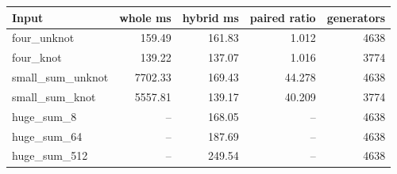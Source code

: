 \begin{center}
\begin{tabular}{@{}lrrrr@{}}
\toprule
Input & whole ms & hybrid ms & paired ratio & generators \\
\midrule
four\_unknot & 159.49 & 161.83 & 1.012 & 4638 \\
four\_knot & 139.22 & 137.07 & 1.016 & 3774 \\
small\_sum\_unknot & 7702.33 & 169.43 & 44.278 & 4638 \\
small\_sum\_knot & 5557.81 & 139.17 & 40.209 & 3774 \\
huge\_sum\_8 & -- & 168.05 & -- & 4638 \\
huge\_sum\_64 & -- & 187.69 & -- & 4638 \\
huge\_sum\_512 & -- & 249.54 & -- & 4638 \\
\bottomrule
\end{tabular}
\end{center}
